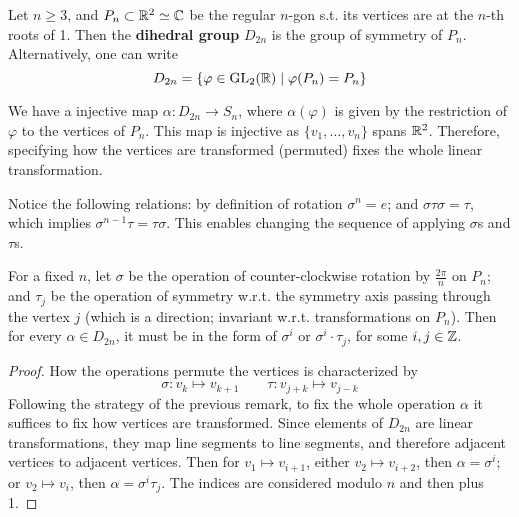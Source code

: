 \documentclass{article}
\begin{document}
\begin{definition}
    Let $n \geq 3$, and $P_n \subset \mathbb{R}^2 \simeq \mathbb{C}$ be the regular $n$-gon s.t. its vertices are at the $n$-th roots of 1. Then the \textbf{dihedral group} $D_{2n}$ is the group of symmetry of $P_n$. Alternatively, one can write
    \[
        D_{2n} = \{ \varphi \in \mathrm{GL}_2(\mathbb{R}) \mid \varphi(P_n) = P_n \}
    \]
\end{definition}

\begin{remark}
    We have a injective map $\alpha: D_{2n} \to S_n$, where $\alpha(\varphi)$ is given by the restriction of $\varphi$ to the vertices of $P_n$. This map is injective as $\{v_1, \dots, v_n\}$ spans $\mathbb{R}^2$. Therefore, specifying how the vertices are transformed (permuted) fixes the whole linear transformation.
\end{remark}

\begin{remark} \label{rmk: rule of computing dihedral group}
    Notice the following relations: by definition of rotation $\sigma^n = e$; and $\sigma \tau \sigma = \tau$, which implies $\sigma^{n-1} \tau = \tau \sigma$. This enables changing the sequence of applying $\sigma$s and $\tau$s.
\end{remark}

\begin{proposition}
    For a fixed $n$, let $\sigma$ be the operation of counter-clockwise rotation by $\frac{2\pi}{n}$ on $P_n$; and $\tau_j$ be the operation of symmetry w.r.t. the symmetry axis passing through the vertex $j$ (which is a direction; invariant w.r.t. transformations on $P_n$). Then for every $\alpha \in D_{2n}$, it must be in the form of $\sigma^i$ or $\sigma^i \cdot \tau_j$, for some $i, j \in \mathbb{Z}$.
\end{proposition}

\begin{proof}
    How the operations permute the vertices is characterized by
    \[
        \sigma: v_k \mapsto v_{k + 1} \qquad \tau: v_{j+k} \mapsto v_{j-k}
    \]
    Following the strategy of the previous remark, to fix the whole operation $\alpha$ it suffices to fix how vertices are transformed. Since elements of $D_{2n}$ are linear transformations, they map line segments to line segments, and therefore adjacent vertices to adjacent vertices. Then for $v_1 \mapsto v_{i+1}$, either $v_2 \mapsto v_{i+2}$, then $\alpha = \sigma^i$; or $v_2 \mapsto v_{i}$, then $\alpha = \sigma^i \tau_j$. The indices are considered modulo $n$ and then plus 1. 
\end{proof}
\end{document}
